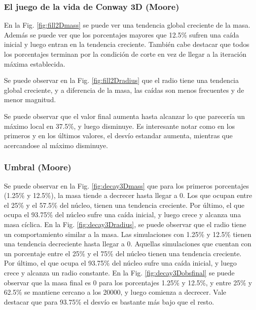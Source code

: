 \subsubsection{El juego de la vida de Conway 3D (Moore)}
En la Fig. \ref{fig:fill2Dmass} se puede ver una tendencia global creciente de la masa. Además se puede ver que los porcentajes mayores que 12.5\% sufren una caída inicial y luego entran en la tendencia creciente.
También cabe destacar que todos los porcentajes terminan por la condición de corte en vez de llegar a la iteración máxima establecida.

Se puede observar en la Fig. \ref{fig:fill2Dradius} que el radio tiene una tendencia global creciente, y a diferencia de la masa, las caídas son menos frecuentes y de menor magnitud.

Se puede observar que el valor final aumenta hasta alcanzar lo que parecería un máximo local en 37.5\%, y luego disminuye.
Es interesante notar como en los primeros y en los últimos valores, el desvío estandar aumenta, mientras que acercandose al máximo disminuye.


\subsubsection{Umbral (Moore)}
Se puede observar en la Fig. \ref{fig:decay3Dmass} que para los primeros porcentajes (1.25\% y 12.5\%), la masa tiende a decrecer hasta llegar a $0$.
Los que ocupan entre el 25\% y el 57.5\% del núcleo, tienen una tendencia creciente.
Por último, el que ocupa el 93.75\% del núcleo sufre una caída inicial, y luego crece y alcanza una masa cíclica.
En la Fig. \ref{fig:decay3Dradius}, se puede observar que el radio tiene un comportamiento similar a la masa.
Las simulaciones con 1.25\% y 12.5\% tienen una tendencia decreciente hasta llegar a $0$.
Aquellas simulaciones que cuentan con un porcentaje entre el 25\% y el 75\% del núcleo tienen una tendencia creciente.
Por último, el que ocupa el 93.75\% del núcleo sufre una caída inicial, y luego crece y alcanza un radio constante.
En la Fig. \ref{fig:decay3Dobsfinal} se puede observar que la masa final es 0 para los porcentajes 1.25\% y 12.5\%, y entre 25\% y 62.5\% se mantiene cercano a los 20000, y luego comienza a decrecer. Vale destacar que para 93.75\% el desvío es bastante más bajo que el resto.

